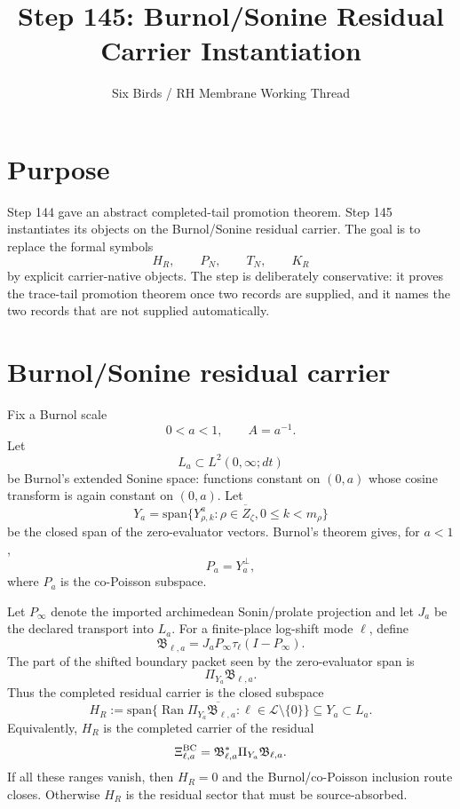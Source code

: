 \documentclass[11pt]{article}
\title{Step 145: Burnol/Sonine Residual Carrier Instantiation}
\author{Six Birds / RH Membrane Working Thread}
\date{}
\begin{document}
\maketitle

\section*{Purpose}
Step 144 gave an abstract completed-tail promotion theorem.  Step 145 instantiates its objects on the Burnol/Sonine residual carrier.  The goal is to replace the formal symbols
\[
H_R,\qquad P_N,\qquad T_N,\qquad K_R
\]
by explicit carrier-native objects.  The step is deliberately conservative: it proves the trace-tail promotion theorem once two records are supplied, and it names the two records that are not supplied automatically.

\section{Burnol/Sonine residual carrier}
Fix a Burnol scale
\[
0<a<1,\qquad A=a^{-1}.
\]
Let
\[
L_a\subset L^2(0,\infty;dt)
\]
be Burnol's extended Sonine space: functions constant on $(0,a)$ whose cosine transform is again constant on $(0,a)$.  Let
\[
Y_a=\overline{\mathrm{span}\{Y^a_{\rho,k}: \rho \in Z_\zeta,
0\le k<m_\rho\}}
\]
be the closed span of the zero-evaluator vectors.  Burnol's theorem gives, for $a<1$,
\[
P_a=Y_a^\perp,
\]
where $P_a$ is the co-Poisson subspace.

Let $P_\infty$ denote the imported archimedean Sonin/prolate projection and let $J_a$ be the declared transport into $L_a$.  For a finite-place log-shift mode $\ell$, define
\[
\mathfrak B_{\ell,a}=J_aP_\infty\tau_\ell(I-P_\infty).
\]
The part of the shifted boundary packet seen by the zero-evaluator span is
\[
\Pi_{Y_a}\mathfrak B_{\ell,a}.
\]
Thus the completed residual carrier is the closed subspace
\[
\boxed{
H_R:=\overline{\mathrm{span}\{\operatorname{Ran}\Pi_{Y_a}\mathfrak B_{\ell,a}:
\ell\in\mathcal L\setminus\{0\}\}}\subseteq Y_a\subset L_a.
}
\]
Equivalently, $H_R$ is the completed carrier of the residual
\[
\Xi^{\rm BC}_{\ell,a}=\mathfrak B_{\ell,a}^{*}\Pi_{Y_a}\mathfrak B_{\ell,a}.
\]
If all these ranges vanish, then $H_R=0$ and the Burnol/co-Poisson inclusion route closes.  Otherwise $H_R$ is the residual sector that must be source-absorbed.
\end{document}
